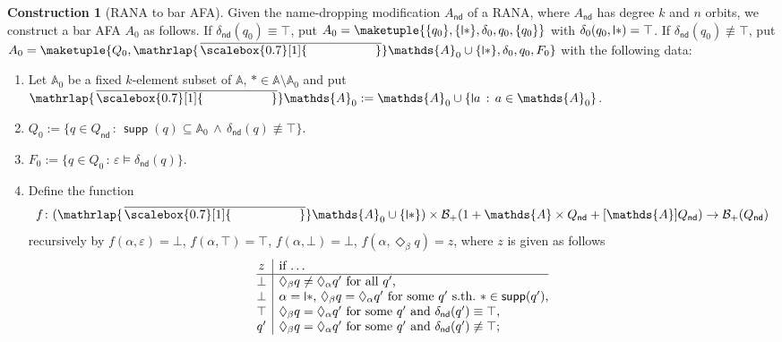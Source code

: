 \documentclass[10pt,a4paper]{amsart}
\theoremstyle{definition}
\newtheorem{construction}[theo]{Construction}
\newcommand{\seq}{\subseteq}
\newcommand{\At}{\mathds{A}}
\newcommand{\op}[1]{\operatorname{\mathsf{#1}}}
\newcommand{\nd}{\op{nd}}
\newcommand{\allbool}{\mathcal{B}}
\newcommand{\posbool}{\allbool_+}
\DeclareMathOperator{\supp}{\mathsf{supp}}
\newcommand{\names}{\At}
\newcommand{\Abstr}[2][\names]{[#1]#2}
\newcommand{\set}[1]{\{#1\}}
\newcommand{\setw}[2]{\{#1\,:\,#2\}}
\newcommand{\takeout}[1]{\empty}
\newcommand{\mybar}[3]{%
  \mathrlap{\hspace{#2}\overline{\scalebox{#1}[1]{\phantom{\ensuremath{#3}}}}}\ensuremath{#3}
}
\newcommand{\barNames}{{\mybar{0.7}{1.25pt}{\names}}}
\renewcommand{\vDash}{\models}
\newcommand{\midmid}{\hspace{0.2ex}{\rule[-0.1ex]{0.6pt}{1.65ex}}\hspace{0.2ex}}
\newcommand{\newletter}[1]{{\midmid}#1}
\begin{document}
\begin{construction}[RANA to bar AFA] \label{constr:barafa}
 Given the name-dropping modification $A_{\nd}$ of a RANA, where $A_{\nd}$
  has degree $k$ and $n$ orbits, we construct a bar AFA $A_0$ as follows. If $\delta_{\nd}(q_0) \equiv
  \top$, put $A_0 = \maketuple{\set{q_0}, \set{\newletter{\ast}}, \delta_0, q_0, \set{q_0}}$
  with $\delta_0(q_0, \newletter{\ast}) = \top$. If $\delta_{\nd}(q_0) \not\equiv
  \top$, put $A_0 = \maketuple{Q_0, \barNames_0 \cup \set{\newletter{\ast}}, \delta_0, q_0, F_0}$ with the following data:
  \begin{enumerate}
    \item Let $\names_0$ be a fixed $k$-element subset of $\names$, $\ast \in \names\setminus \names_0$ and
      put $\barNames_0 := \names_0 \cup \setw{\newletter{a}}{a \in \names_0}$.
    \item    
      $Q_0 := \setw{q \in Q_{\nd}}{\supp(q) \seq \names_0 \,\wedge\, \delta_{\nd}(q)
      \not\equiv \top}$.
     \item $F_0 := \setw{q \in Q_0}{\varepsilon\vDash\delta_{\nd}(q)}$.
    \item\label{constr:barafa:3} Define the function
      \[f\colon (\barNames_0 \cup \set{\newletter{\ast}}) \times \posbool(1 + \names \times Q_{\nd} + \Abstr{Q_{\nd}})
      \to \posbool(Q_{\nd})\] recursively by ${f(\alpha, \varepsilon) = \bot}$, $f(\alpha, \top) = \top$,
      $f(\alpha, \bot) = \bot$, $f(\alpha, \Diamond_\beta q) = z$, where $z$ is given as follows 
      \[
        \begin{array}{@{}c|l@{}}
          z %
          & \text{if \dots}
          \\
          \hline
          \bot & \text{$\Diamond_\beta q \neq \Diamond_\alpha q'$ for all $q'$,}\\
          \bot & \text{$\alpha = \newletter{\ast}$, $\Diamond_\beta q = \Diamond_\alpha q'$
            for some $q'$ s.th.~$\ast \in \supp(q')$,}\\
          \top & \text{$\Diamond_\beta q = \Diamond_\alpha q'$ for some $q'$ and $\delta_{\nd}(q') \equiv \top$,}\\
          q' & \text{$\Diamond_\beta q = \Diamond_\alpha q'$ for some $q'$ and $\delta_{\nd}(q') \not\equiv \top$;}
        \end{array}
     \takeout{ %
      f(\alpha, \Diamond_\beta q)
      =
      \begin{cases}
        \bot & \text{if $\Diamond_\beta q \neq \Diamond_\alpha q'$ for all $q'$,} \\

\end{cases}}\]
\end{enumerate}
\end{construction}
\end{document}
